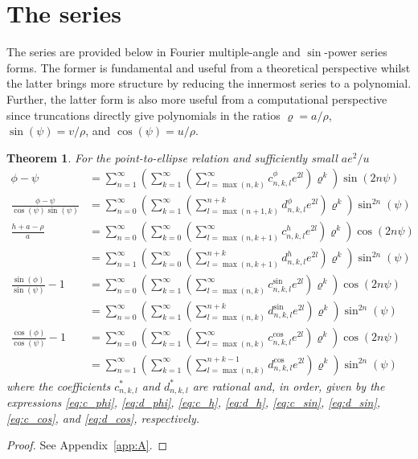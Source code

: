 \documentclass[a4paper]{amsart}
\newtheorem{thm}{Theorem}
\begin{document}
\section{The series}
The series are provided below in Fourier multiple-angle and $\sin$-power series forms. The former is fundamental and useful from a theoretical perspective whilst the latter brings more structure by reducing the innermost series to a polynomial. Further, the latter form is also more useful from a computational perspective since truncations directly give polynomials in the ratios $\varrho = a/\rho$, $\sin(\psi) = v / \rho$, and $\cos(\psi) = u /\rho$.

\vspace{3mm}
\begin{thm}
For the point-to-ellipse relation and sufficiently small $ae^2/u$
\vspace{1mm}
\begin{align*}
\phi-\psi &=\sum_{n=1}^\infty\left(\sum_{k=1}^\infty\left(\sum_{l=\max(n,k)}^\infty c^{\phi}_{n,k,l}e^{2l}\right)\varrho^k\right)\sin(2n\psi)\\
\frac{\phi-\psi}{\cos(\psi)\sin(\psi)}&=\sum_{n=0}^{\infty} \left(\sum_{k=1}^\infty\left(\sum_{l=\max(n+1,k)}^{n+k} d^{\phi}_{n,k,l}  e^{2l}\right)\varrho^k\right)\sin^{2n}(\psi)\\[2mm]
%
\frac{h + a - \rho}{a}
&=\sum_{n=0}^\infty\left(\sum_{k=0}^\infty\left(\sum_{l=\max(n,k+1)}^\infty c^h_{n,k,l}e^{2l}\right)\varrho^k\right)\cos(2n\psi)\\
&=\sum_{n=1}^\infty\left(\sum_{k=0}^\infty\left(\sum_{l=\max(n,k+1)}^{n+k} d^h_{n,k,l}e^{2l}\right)\varrho^k\right)\sin^{2n}(\psi)\\[2mm]
%
\frac{\sin(\phi)}{\sin(\psi)}-1&=\sum_{n=0}^\infty\left( \sum_{k=1}^\infty\left(\sum_{l=\max(n,k)}^\infty c^{\sin}_{n,k,l}e^{2l}\right)\varrho^k\right)\cos(2n\psi)\\
&=\sum_{n=0}^\infty\left( \sum_{k=1}^\infty\left(\sum_{l=\max(n,k)}^{n+k} d^{\sin}_{n,k,l}e^{2l}\right)\varrho^k\right)\sin^{2n}(\psi)\\[2mm]
%
\frac{\cos(\phi)}{\cos(\psi)}-1&=\sum_{n=0}^\infty\left( \sum_{k=1}^\infty\left(\sum_{l=\max(n,k)}^\infty c^{\cos}_{n,k,l}e^{2l}\right)\varrho^k\right)\cos(2n\psi)\\
&=\sum_{n=1}^\infty\left( \sum_{k=1}^\infty\left(\sum_{l=\max(n,k)}^{n+k-1} d^{\cos}_{n,k,l}e^{2l}\right)\varrho^k\right)\sin^{2n}(\psi)
\end{align*}
\vspace{1mm}
where the coefficients $c^{*}_{n,k,l}$ and $d^{*}_{n,k,l}$ are rational and, in order, given by the expressions \eqref{eq:c_phi}, \eqref{eq:d_phi}, \eqref{eq:c_h}, \eqref{eq:d_h}, \eqref{eq:c_sin}, \eqref{eq:d_sin}, \eqref{eq:c_cos}, and \eqref{eq:d_cos}, respectively.
\end{thm}
\begin{proof}
See Appendix~\ref{app:A}.
\end{proof}
\vspace{3mm}
\end{document}
